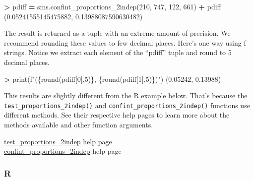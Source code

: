 \documentclass[
]{book}
\newenvironment{Shaded}{\begin{snugshade}}{\end{snugshade}}
\newcommand{\BuiltInTok}[1]{#1}
\newcommand{\DecValTok}[1]{\textcolor[rgb]{0.00,0.00,0.81}{#1}}
\newcommand{\FloatTok}[1]{\textcolor[rgb]{0.00,0.00,0.81}{#1}}
\newcommand{\NormalTok}[1]{#1}
\newcommand{\OperatorTok}[1]{\textcolor[rgb]{0.81,0.36,0.00}{\textbf{#1}}}
\newcommand{\SpecialCharTok}[1]{\textcolor[rgb]{0.00,0.00,0.00}{#1}}
\newcommand{\SpecialStringTok}[1]{\textcolor[rgb]{0.31,0.60,0.02}{#1}}
\begin{document}
\begin{Shaded}
\begin{Highlighting}[]
\OperatorTok{\textgreater{}}\NormalTok{ pdiff }\OperatorTok{=}\NormalTok{ sms.confint\_proportions\_2indep(}\DecValTok{210}\NormalTok{, }\DecValTok{747}\NormalTok{, }\DecValTok{122}\NormalTok{, }\DecValTok{661}\NormalTok{)}
\OperatorTok{+}\NormalTok{ pdiff}
\NormalTok{(}\FloatTok{0.05241555145475882}\NormalTok{, }\FloatTok{0.13988087590630482}\NormalTok{)}
\end{Highlighting}
\end{Shaded}

The result is returned as a tuple with an extreme amount of precision. We recommend rounding these values to few decimal places. Here's one way using f strings. Notice we extract each element of the ``pdiff'' tuple and round to 5 decimal places.

\begin{Shaded}
\begin{Highlighting}[]
\OperatorTok{\textgreater{}} \BuiltInTok{print}\NormalTok{(}\SpecialStringTok{f"(}\SpecialCharTok{\{}\BuiltInTok{round}\NormalTok{(pdiff[}\DecValTok{0}\NormalTok{],}\DecValTok{5}\NormalTok{)}\SpecialCharTok{\}}\SpecialStringTok{, }\SpecialCharTok{\{}\BuiltInTok{round}\NormalTok{(pdiff[}\DecValTok{1}\NormalTok{],}\DecValTok{5}\NormalTok{)}\SpecialCharTok{\}}\SpecialStringTok{)"}\NormalTok{)}
\NormalTok{(}\FloatTok{0.05242}\NormalTok{, }\FloatTok{0.13988}\NormalTok{)}
\end{Highlighting}
\end{Shaded}

This results are slightly different from the R example below. That's because the \texttt{test\_proportions\_2indep()} and \texttt{confint\_proportions\_2indep()} functions use different methods. See their respective help pages to learn more about the methods available and other function arguments.

\href{https://www.statsmodels.org/dev/generated/statsmodels.stats.proportion.test_proportions_2indep.html\#statsmodels.stats.proportion.test_proportions_2indep}{test\_proportions\_2indep} help page\\
\href{https://www.statsmodels.org/dev/generated/statsmodels.stats.proportion.confint_proportions_2indep.html\#statsmodels.stats.proportion.confint_proportions_2indep}{confint\_proportions\_2indep} help page

\hypertarget{r-48}{%
\subsubsection*{R}\label{r-48}}
\end{document}
